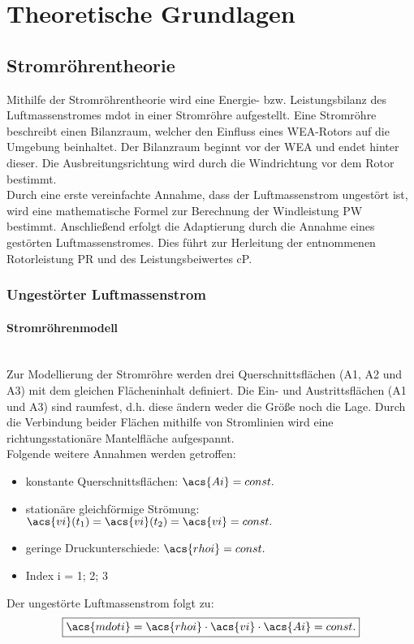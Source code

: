 \section{Theoretische Grundlagen} \label{theo_grundl}

\subsection{Stromröhrentheorie}
Mithilfe der Stromröhrentheorie wird eine Energie- bzw. Leistungsbilanz des Luftmassenstromes \acs{mdot} in einer Stromröhre aufgestellt. Eine Stromröhre beschreibt einen Bilanzraum, welcher den Einfluss eines WEA-Rotors auf die Umgebung beinhaltet. Der Bilanzraum beginnt vor der WEA und endet hinter dieser. Die Ausbreitungsrichtung wird durch die Windrichtung vor dem Rotor bestimmt. \\
Durch eine erste vereinfachte Annahme, dass der Luftmassenstrom ungestört ist, wird eine mathematische Formel zur Berechnung der Windleistung \acs{PW} bestimmt. Anschließend erfolgt die Adaptierung durch die Annahme eines gestörten Luftmassenstromes. Dies führt zur Herleitung der entnommenen Rotorleistung \acs{PR} und des Leistungsbeiwertes \acs{cP}.

\subsubsection{Ungestörter Luftmassenstrom}

\paragraph{Stromröhrenmodell}\mbox{}\smallskip\\
Zur Modellierung der Stromröhre werden drei Querschnittsflächen (\acs{A1}, \acs{A2} und \acs{A3}) mit dem gleichen Flächeninhalt definiert. Die Ein- und Austrittsflächen (\acs{A1} und \acs{A3}) sind raumfest, d.h. diese ändern weder die Größe noch die Lage. Durch die Verbindung beider Flächen mithilfe von Stromlinien wird eine richtungsstationäre Mantelfläche aufgespannt.\\

Folgende weitere Annahmen werden getroffen:
\begin{itemize}
    \item konstante Querschnittsflächen: $\acs{Ai} = const.$
    \item stationäre gleichförmige Strömung: $\acs{vi}(t_{\mathrm{1}}) = \acs{vi}(t_{\mathrm{2}}) = \acs{vi} = const.$
    \item geringe Druckunterschiede: $\acs{rhoi} = const.$
    \item Index i = 1; 2; 3
\end{itemize}
\bigskip
Der ungestörte Luftmassenstrom folgt zu: 
\begin{equation} \label{eq:Gleichung2.1}
    \boxed{\acs{mdoti} = \acs{rhoi} \cdot \acs{vi} \cdot \acs{Ai} = const.}
\end{equation}

